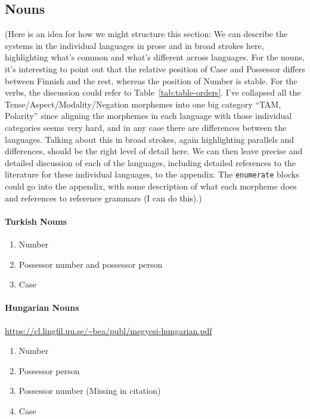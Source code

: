 \documentclass[11pt,letterpaper]{article}
\newcommand\mhahn[1]{{\color{red}(#1)}}
\newcommand\becky[1]{{\color{blue}(#1)}}
\begin{document}
\subsection{Nouns}

\mhahn{Here is an idea for how we might structure this section: We can describe the systems in the individual languages in prose and in broad strokes here, highlighting what's common and what's different across languages. For the nouns, it's interesting to point out that the relative position of Case and Possessor differs between Finnish and the rest, whereas the position of Number is stable. For the verbs, the discussion could refer to Table~\ref{tab:table-orders}. I've collapsed all the Tense/Aspect/Modality/Negation morphemes into one big category ``TAM, Polarity'' since aligning the morphemes in each language with those individual categories seems very hard, and in any case there are differences between the languages. Talking about this in broad strokes, again highlighting parallels and differences, should be the right level of detail here. We can then leave precise and detailed discussion of each of the languages, including detailed references to the literature for these individual languages, to the appendix. The \texttt{enumerate} blocks could go into the appendix, with some description of what each morpheme does and references to reference grammars (I can do this).}

\paragraph{Turkish Nouns}
\begin{enumerate}
    \item Number
    \item Possessor number and possessor person
    \item Case 
\end{enumerate}

\paragraph{Hungarian Nouns}
\url{https://cl.lingfil.uu.se/~bea/publ/megyesi-hungarian.pdf}
\begin{enumerate}
    \item Number
    \item Possessor person
    \item Possessor number \becky{Missing in citation}
    \item Case 
\end{enumerate}
\end{document}
